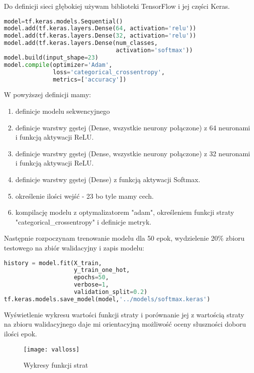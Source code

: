 Do definicji sieci głębokiej używam biblioteki TensorFlow i jej części Keras.
\begin{lstlisting}[language=Python, caption=Definicja sieci głębokiej z funkcją aktywacji Softmax]
model=tf.keras.models.Sequential()
model.add(tf.keras.layers.Dense(64, activation='relu'))
model.add(tf.keras.layers.Dense(32, activation='relu'))
model.add(tf.keras.layers.Dense(num_classes, 
                                activation='softmax'))
model.build(input_shape=23)
model.compile(optimizer='Adam',
              loss='categorical_crossentropy',
              metrics=['accuracy'])
\end{lstlisting}

W powyższej definicji mamy:
\begin{enumerate}
    \item definicje modelu sekwencyjnego
    \item definicje warstwy gęstej (Dense, wszystkie neurony połączone) z 64 neuronami i funkcją aktywacji ReLU.
    \item definicje warstwy gęstej (Dense, wszystkie neurony połączone) z 32 neuronami i funkcją aktywacji ReLU. 
    \item definicje warstwy gęstej (Dense) z funkcją aktywacji Softmax.
    \item określenie ilości wejść - 23 bo tyle mamy cech.
    \item kompilację modelu z optymalizatorem "adam", określeniem funkcji straty "categorical\_crossentropy" i definicje metryk.
\end{enumerate}


Następnie rozpoczynam trenowanie modelu dla 50 epok, wydzielenie 20\% zbioru testowego na zbiór walidacyjny i zapis modelu:
\begin{lstlisting}[language=Python, caption=Definicja sieci głębokiej z funkcją aktywacji Softmax]
history = model.fit(X_train,
                    y_train_one_hot,
                    epochs=50,
                    verbose=1,
                    validation_split=0.2)
tf.keras.models.save_model(model,'../models/softmax.keras')
\end{lstlisting}


Wyświetlenie wykresu wartości funkcji straty i porównanie jej z wartością straty na zbioru walidacyjnego daje mi orientacyjną możliwość oceny słuszności doboru ilości epok.\\


\begin{figure}[h]
    \centering
    \texttt{[image: valloss]}
    \caption{Wykresy funkcji strat}
    \label{fig:valloss}
\end{figure}

